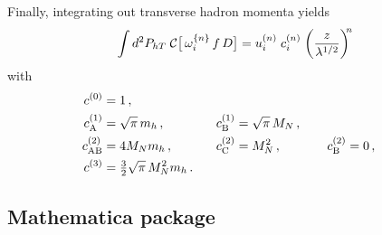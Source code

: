 \documentclass[a4paper,11pt]{article}
\newcommand{\be}{\begin{equation}}
\newcommand{\ee}{\end{equation}}
\def\Phperp{P_{hT}}
\newcommand*{\BibPath}{.}%
\begin{document}
Finally, integrating out transverse hadron momenta yields
\be
	\int d^2\Phperp\;
	{\cal C}\bigl[\,\omega^{\{n\}}_{i} \, f \, D \bigr] 
	= u^{(n)}_{i} \;c^{(n)}_{i}\;\biggl(\frac{z}{\lambda^{1/2}}\biggr)^{\!\!n}
\ee
with
\begin{alignat}{7}
	c^{(0)}_{\rm  } 	&= 1 \, , \\
	c^{(1)}_{\rm A} 	&= \sqrt{\pi}\,m_h	\, , &
	c^{(1)}_{\rm B} 	&= \sqrt{\pi}\,M_N	\, , \\
	c^{(2)}_{\rm AB} 	&= 4M_Nm_h		\, , \;\;\;\;\;\; & 
	c^{(2)}_{\rm C} 	&= M_N^2 		\, , \;\;\;\;\;\;\;\;\;\; & 
	c^{(2)}_{\rm B}	&= 0 			\, ,\\
	c^{(3)}_{\rm  } 	&= {\textstyle\frac32}\sqrt{\pi} \,M_N^2m_h 
	\, . \;\;\;     &
			&
	\label{Eq:Gaussian-integrals-working-III}
\end{alignat}

\newpage
\subsection{Mathematica package}
\label{app:package}


\end{document}

